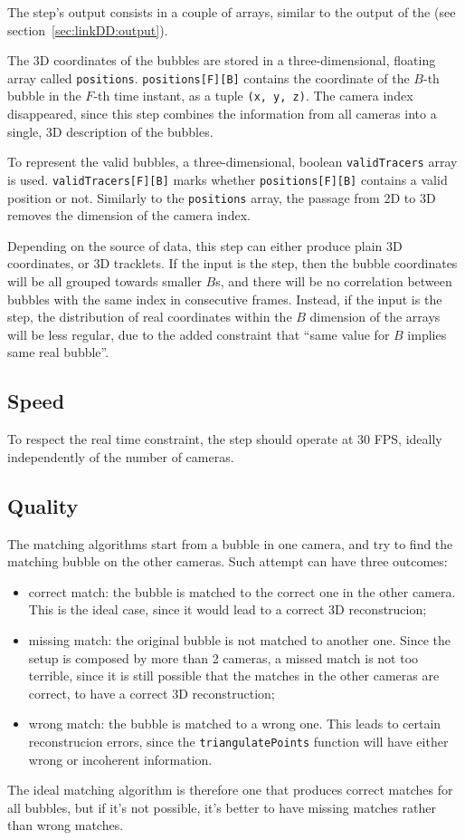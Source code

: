 The \match* step's output consists in a couple of arrays, similar to the output of the \linkDD* (see section~\ref{sec:linkDD:output}).

The 3D coordinates of the bubbles are stored in a three-dimensional, floating array called \texttt{positions}. \texttt{positions[F][B]} contains the coordinate of the $B$-th bubble in the $F$-th time instant, as a tuple \texttt{(x, y, z)}.
The camera index disappeared, since this step combines the information from all cameras into a single, 3D description of the bubbles.

To represent the valid bubbles, a three-dimensional, boolean \texttt{validTracers} array is used.
\texttt{validTracers[F][B]} marks whether \texttt{positions[F][B]} contains a valid position or not.
Similarly to the \texttt{positions} array, the passage from 2D to 3D removes the dimension of the camera index.

Depending on the source of data, this step can either produce plain 3D coordinates, or 3D tracklets.
If the input is the \locate* step, then the bubble coordinates will be all grouped towards smaller $B$s, and there will be no correlation between bubbles with the same index in consecutive frames.
Instead, if the input is the \linkDD* step, the distribution of real coordinates within the $B$ dimension of the arrays will be less regular, due to the added constraint that ``same value for $B$ implies same real bubble''.

\subsection{Speed}

To respect the real time constraint, the \match* step should operate at 30 FPS, ideally independently of the number of cameras.

\subsection{Quality}

The matching algorithms start from a bubble in one camera, and try to find the matching bubble on the other cameras.
Such attempt can have three outcomes:
\begin{itemize}
	\itemsep 0em
	\item correct match: the bubble is matched to the correct one in the other camera. This is the ideal case, since it would lead to a correct 3D reconstrucion;
	\item missing match: the original bubble is not matched to another one. Since the setup is composed by more than 2 cameras, a missed match is not too terrible, since it is still possible that the matches in the other cameras are correct, to have a correct 3D reconstruction;
	\item wrong match: the bubble is matched to a wrong one. This leads to certain reconstrucion errors, since the \texttt{triangulatePoints} function will have either wrong or incoherent information.
\end{itemize}
The ideal matching algorithm is therefore one that produces correct matches for all bubbles, but if it's not possible, it's better to have missing matches rather than wrong matches.

